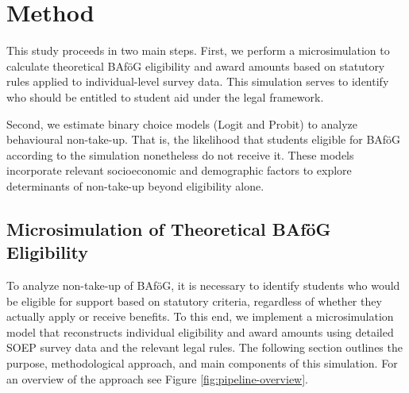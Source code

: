 %
%





\section{Method} 
This study proceeds in two main steps. 
First, we perform a microsimulation to calculate theoretical BAföG eligibility and award amounts based on statutory rules applied to individual-level survey data. 
This simulation serves to identify who should be entitled to student aid under the legal framework.

Second, we estimate binary choice models (Logit and Probit) to analyze behavioural non-take-up. 
That is, the likelihood that students eligible for BAföG according to the simulation nonetheless do not receive it. 
These models incorporate relevant socioeconomic and demographic factors to explore determinants of non-take-up beyond eligibility alone.

\subsection{Microsimulation of Theoretical BAföG Eligibility} 
To analyze non-take-up of BAföG, it is necessary to identify students who would be eligible for support based on statutory criteria, regardless of whether they actually apply or receive benefits. 
To this end, we implement a microsimulation model that reconstructs individual eligibility and award amounts using detailed SOEP survey data and the relevant legal rules.
The following section outlines the purpose, methodological approach, and main components of this simulation. 
For an overview of the approach see Figure \ref{fig:pipeline-overview}.

